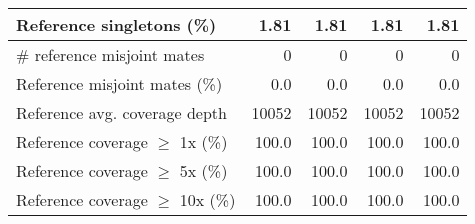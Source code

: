\documentclass[12pt,a4paper]{article}
\begin{document}
\begin{table}[ht]
\begin{center}
\begin{tabular}{|l*{4}{|r}|}
Reference singletons (\%) & 1.81 & 1.81 & 1.81 & 1.81 \\ \hline
\# reference misjoint mates & 0 & 0 & 0 & 0 \\ \hline
Reference misjoint mates (\%) & 0.0 & 0.0 & 0.0 & 0.0 \\ \hline
Reference avg. coverage depth & 10052 & 10052 & 10052 & 10052 \\ \hline
Reference coverage $\geq$ 1x (\%) & 100.0 & 100.0 & 100.0 & 100.0 \\ \hline
Reference coverage $\geq$ 5x (\%) & 100.0 & 100.0 & 100.0 & 100.0 \\ \hline
Reference coverage $\geq$ 10x (\%) & 100.0 & 100.0 & 100.0 & 100.0 \\ \hline
\end{tabular}
\end{center}
\end{table}
\end{document}
